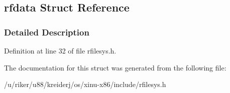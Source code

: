 \hypertarget{structrfdata}{}\subsection{rfdata Struct Reference}
\label{structrfdata}


\subsubsection{Detailed Description}


Definition at line 32 of file rfilesys.\+h.



The documentation for this struct was generated from the following file\+:\begin{DoxyCompactItemize}
\item 
/u/riker/u88/kreiderj/os/xinu-\/x86/include/rfilesys.\+h\end{DoxyCompactItemize}
